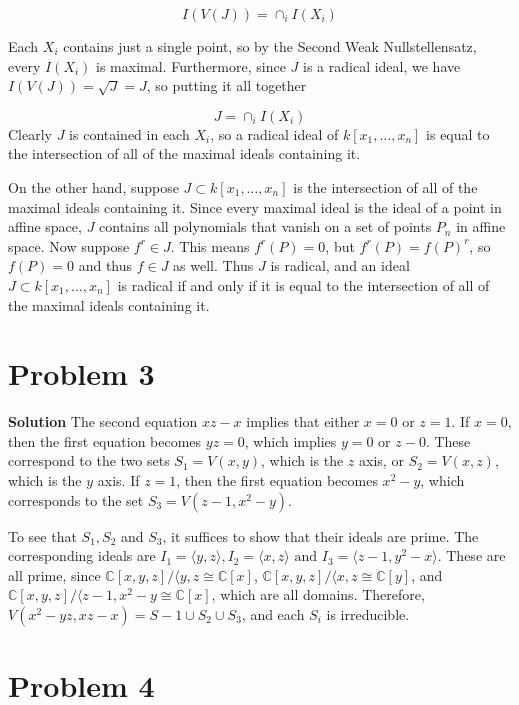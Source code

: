 \documentclass{article}
\begin{document}
\[ I(V(J)) = \cap _{i} I(X_i)  \]

Each $X_i$ contains just a single point, so by the Second Weak Nullstellensatz, every $I(X_i)$ is maximal. Furthermore, since $J$ is a radical ideal, we have $I(V(J)) = \sqrt{J} = J$, so putting 
it all together

\[ J = \cap_i I(X_i)\] Clearly $J$ is contained in each $X_i$, so a radical ideal of $k[x_1, \ldots, x_n]$ is equal to the intersection of all of the maximal ideals containing it.

On the other hand, suppose $J \subset k[x_1, \ldots, x_n] $ is the intersection of all of the maximal ideals containing it. Since every maximal ideal is the ideal of a point in affine space, $J$ contains 
all polynomials that vanish on a set of points $P_n$ in affine space. Now suppose $f^r \in J$. This means $f^r(P) = 0$, but $f^r(P) = f(P)^r $, so $f(P) = 0$ and thus $f \in J$ as well. Thus $J$ is radical,
and an ideal $J \subset k[x_1, \ldots, x_n]$ is radical if and only if it is equal to the intersection of all of the maximal ideals containing it.

\section{Problem 3}

\textbf{Solution } The second equation $xz - x$ implies that either $x = 0$ or $z = 1$. If $x = 0$, then the first equation becomes $yz = 0$, which implies $y = 0$ or $z - 0$. 
These correspond to the two sets $S_1 = V(x, y)$, which is the $z$ axis, or $S_2 = V(x, z)$, which is the $y$ axis. If $z = 1$, then the first equation becomes $x^2 - y$, which corresponds 
to the set $S_3 = V(z-1, x^2 - y)$. 

To see that $S_1, S_2$ and $S_3$, it suffices to show that their ideals are prime. The corresponding ideals are $I_1 = \langle y, z \rangle, I_2 = \langle x, z \rangle \text{ and } I_3 = \langle z-1, y^2 - x \rangle$. These
are all prime, since $\mathbb{C}[x, y, z] / \langle y, z \cong \mathbb{C}[x]$, $\mathbb{C}[x, y, z] / \langle x, z \cong \mathbb{C}[y]$, and $\mathbb{C}[x, y, z] / \langle z-1, x^2-y \cong \mathbb{C}[x]$, which are all domains. 
Therefore, $V(x^2 - yz, xz-x) = S-1 \cup S_2 \cup S_3$, and each $S_i$ is irreducible. 

\section{Problem 4}
\end{document}
